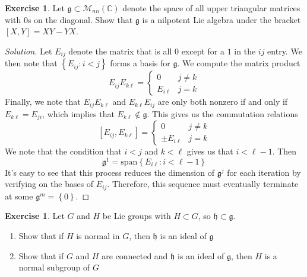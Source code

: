 \documentclass[psamsfonts]{amsart}
\theoremstyle{definition}
\newtheorem{exer}[thm]{Exercise}
\theoremstyle{remark}
\newcommand{\C}{\mathbb{C}}
\newcommand{\M}{\mathcal{M}}
\newcommand{\g}{\mathfrak{g}}
\newcommand{\bra}[2]{ \left[ #1, #2 \right] }
\newcommand{\set}[1]{\left\lbrace#1 \right\rbrace}
\begin{document}
\begin{exer}
Let $\g \subset \M_{nn}(\C)$ denote the space of all upper triangular matrices with $0$s on the diagonal. Show that $\g$ is a nilpotent Lie algebra under the bracket $\bra{X}{Y} = XY - YX$.
\end{exer}

\begin{proof}[Solution]
Let $E_{ij}$ denote the matrix that is all $0$ except for a $1$ in the $ij$ entry. We then note that $\set{E_{ij}: i < j}$ forms a basis for $\g$. We compute the matrix product
$$E_{ij}E_{k\ell} = \begin{cases}
0 & j \neq k \\
E_{i\ell} & j = k
\end{cases} $$
Finally, we note that $E_{ij}E_{k\ell}$ and $E_{k\ell}E_{ij}$ are only both nonzero if and only if $E_{k\ell} = E_{ji}$, which implies that $E_{k\ell} \notin \g$. This gives us the commutation relations
$$\bra{E_{ij}}{E_{k\ell}} = \begin{cases}
0 & j \neq k \\
\pm E_{i\ell} &j = k
\end{cases} $$
We note that the condition that $i < j$ and $k < \ell$ gives us that $i < \ell - 1$. Then 
$$\g^1 = \text{span} \set{E_{i\ell}: i < \ell - 1} $$
It's easy to see that this process reduces the dimension of $\g^j$ for each iteration by verifying on the bases of $E_{ij}$. Therefore, this sequence must eventually terminate at some $\g^m = \set{0}$.
\end{proof}

\setcounter{thm}{5}

\begin{exer}
Let $G$ and $H$ be Lie groups with $H \subset G$, so $\mathfrak{h} \subset \g$. 
\begin{enumerate}
\item Show that if $H$ is normal in $G$, then $\mathfrak{h}$ is an ideal of $\g$
\item Show that if $G$ and $H$ are connected and $\mathfrak{h}$ is an ideal of $\g$, then $H$ is a normal subgroup of $G$
\end{enumerate}
\end{exer}
\end{document}
